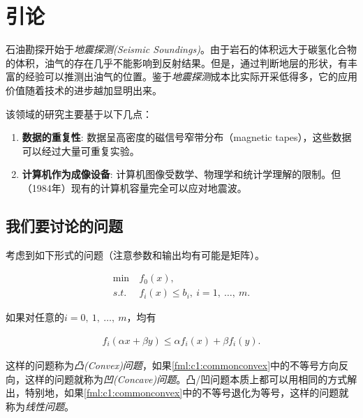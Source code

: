 \chapter{引论}

石油勘探开始于\emph{地震探测(Seismic Soundings)}。由于岩石的体积远大于碳氢化合物的体积，油气的存在几乎不能影响到反射结果。但是，通过判断地层的形状，有丰富的经验可以推测出油气的位置。鉴于\emph{地震探测}成本比实际开采低得多，它的应用价值随着技术的进步越加显明出来。

该领域的研究主要基于以下几点：

\begin{enumerate}
  \item \textbf{数据的重复性}: 数据呈高密度的磁信号窄带分布（magnetic tapes），这些数据可以经过大量可重复实验。
  \item \textbf{计算机作为成像设备}: 计算机图像受数学、物理学和统计学理解的限制。但（1984年）现有的计算机容量完全可以应对地震波。
\end{enumerate}

\section{我们要讨论的问题}
考虑到如下形式的问题（注意参数和输出均有可能是矩阵）。

\begin{problem}[普适优化问题] \label{def:c1:common}
  \begin{subequations}
  	\renewcommand{\theequation}
  	{\theparentequation-\arabic{equation}}
  	\begin{align}
  	  \min~&f_0 (x),\label{fml:c1:common}\\ 
  	  s.t.~&f_i (x) \leqslant b_i,~i=1,~\ldots,~m. \label{fml:c1:commonconst}
  	\end{align}
  \end{subequations}
\end{problem}

如果对任意的$i=0,~1,~\ldots,~m$，均有

\begin{align} \label{fml:c1:commonconvex}
	f_i(\alpha x + \beta y) \leqslant \alpha f_i(x) + \beta f_i(y).
\end{align}

这样的问题称为\emph{凸(Convex)问题}，如果\eqref{fml:c1:commonconvex}中的不等号方向反向，这样的问题就称为\emph{凹(Concave)问题}。凸/凹问题本质上都可以用相同的方式解出，特别地，如果\eqref{fml:c1:commonconvex}中的不等号退化为等号，这样的问题就称为\emph{线性问题}。

